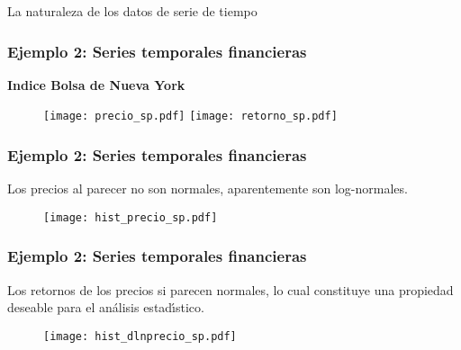 \documentclass[xcolor=(list of options)]{beamer}
\begin{document}
\begin{section}{La naturaleza de los datos de serie de tiempo}
\begin{frame}
\end{frame}
\begin{frame}
\frametitle{Ejemplo 2: Series temporales financieras}
\textbf{Indice Bolsa de Nueva York}
\begin{figure}[t!]
\texttt{[image: precio\_sp.pdf]}
\texttt{[image: retorno\_sp.pdf]}
\end{figure}
\end{frame}

\begin{frame}
\frametitle{Ejemplo 2: Series temporales financieras}
Los precios al parecer no son normales, aparentemente son log-normales.\\
\begin{figure}[t!]
\texttt{[image: hist\_precio\_sp.pdf]}
\end{figure}
\end{frame}

\begin{frame}
\frametitle{Ejemplo 2: Series temporales financieras}
Los retornos de los precios si parecen normales, lo cual constituye una propiedad deseable para el an\'alisis estad\'\i{}stico.\\
\begin{figure}[t!]
\texttt{[image: hist\_dlnprecio\_sp.pdf]}
\end{figure}
\end{frame}

\end{section}
\end{document}
